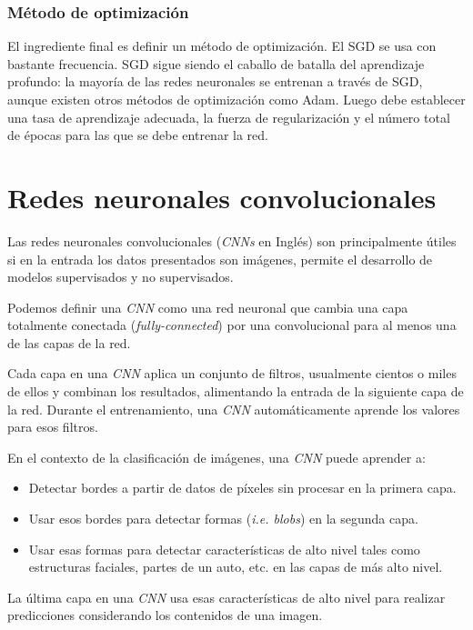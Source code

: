 \documentclass[a4paper,12pt]{article}
\begin{document}
\subsubsection{Método de optimización}
El ingrediente final es definir un método de optimización. El SGD se usa con bastante frecuencia.
SGD sigue siendo el caballo de batalla del aprendizaje profundo: la mayoría de las redes neuronales se entrenan a través de SGD, aunque existen otros métodos de optimización como Adam.
Luego debe establecer una tasa de aprendizaje adecuada, la fuerza de regularización y el número total de épocas para las que se debe entrenar la red.

\section{Redes neuronales convolucionales}
Las redes neuronales convolucionales \citep{rosebrock2017deep} (\textit{CNNs} en Inglés) son principalmente útiles si en la entrada los datos presentados son imágenes, permite el desarrollo de modelos supervisados y no supervisados.

Podemos definir una \textit{CNN} como una red neuronal que cambia una capa totalmente conectada (\textit{fully-connected}) por una convolucional para al menos una de las capas de la red.

Cada capa en una \textit{CNN} aplica un conjunto de filtros, usualmente cientos o miles de ellos y combinan los resultados, alimentando la entrada de la siguiente capa de la red. Durante el entrenamiento, una \textit{CNN} automáticamente aprende los valores para esos filtros.

En el contexto de la clasificación de imágenes, una \textit{CNN} puede aprender a:
\begin{itemize}[noitemsep, topsep=2pt]
	\item Detectar bordes a partir de datos de píxeles sin procesar en la primera capa.
	\item Usar esos bordes para detectar formas (\textit{i.e. blobs}) en la segunda capa.
	\item Usar esas formas para detectar características de alto nivel tales como estructuras faciales, partes de un auto, etc. en las capas de más alto nivel.
\end{itemize}

La última capa en una \textit{CNN} usa esas características de alto nivel para realizar predicciones considerando los contenidos de una imagen.
\end{document}
